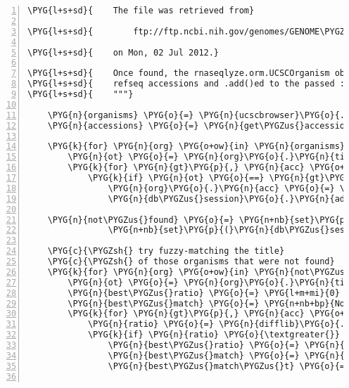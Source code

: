 \begin{Verbatim}[commandchars=\\\{\},numbers=left,firstnumber=1,stepnumber=5]
\PYG{l+s+sd}{    The file was retrieved from}

\PYG{l+s+sd}{        ftp://ftp.ncbi.nih.gov/genomes/GENOME\PYGZus{}REPORTS/prokaryotes.txt}

\PYG{l+s+sd}{    on Mon, 02 Jul 2012.}

\PYG{l+s+sd}{    Once found, the rnaseqlyze.orm.UCSCOrganism objects are updated with the}
\PYG{l+s+sd}{    refseq accessions and .add()ed to the passed :param:db\PYGZus{}session.}
\PYG{l+s+sd}{    """}

    \PYG{n}{organisms} \PYG{o}{=} \PYG{n}{ucscbrowser}\PYG{o}{.}\PYG{n}{get\PYGZus{}org\PYGZus{}list}\PYG{p}{(}\PYG{p}{)}
    \PYG{n}{accessions} \PYG{o}{=} \PYG{n}{get\PYGZus{}accessions}\PYG{p}{(}\PYG{p}{)}

    \PYG{k}{for} \PYG{n}{org} \PYG{o+ow}{in} \PYG{n}{organisms}\PYG{p}{:}
        \PYG{n}{ot} \PYG{o}{=} \PYG{n}{org}\PYG{o}{.}\PYG{n}{title}
        \PYG{k}{for} \PYG{n}{gt}\PYG{p}{,} \PYG{n}{acc} \PYG{o+ow}{in} \PYG{n}{accessions}\PYG{p}{:}
            \PYG{k}{if} \PYG{n}{ot} \PYG{o}{==} \PYG{n}{gt}\PYG{p}{:}
                \PYG{n}{org}\PYG{o}{.}\PYG{n}{acc} \PYG{o}{=} \PYG{n}{acc}
                \PYG{n}{db\PYGZus{}session}\PYG{o}{.}\PYG{n}{add}\PYG{p}{(}\PYG{n}{org}\PYG{p}{)}

    \PYG{n}{not\PYGZus{}found} \PYG{o}{=} \PYG{n+nb}{set}\PYG{p}{(}\PYG{n}{organisms}\PYG{p}{)} \PYG{o}{-} \PYGZbs{}
                \PYG{n+nb}{set}\PYG{p}{(}\PYG{n}{db\PYGZus{}session}\PYG{o}{.}\PYG{n}{query}\PYG{p}{(}\PYG{n}{UCSCOrganism}\PYG{p}{)}\PYG{o}{.}\PYG{n}{all}\PYG{p}{(}\PYG{p}{)}\PYG{p}{)}

    \PYG{c}{\PYGZsh{} try fuzzy-matching the title}
    \PYG{c}{\PYGZsh{} of those organisms that were not found}
    \PYG{k}{for} \PYG{n}{org} \PYG{o+ow}{in} \PYG{n}{not\PYGZus{}found}\PYG{p}{:}
        \PYG{n}{ot} \PYG{o}{=} \PYG{n}{org}\PYG{o}{.}\PYG{n}{title}
        \PYG{n}{best\PYGZus{}ratio} \PYG{o}{=} \PYG{l+m+mi}{0}
        \PYG{n}{best\PYGZus{}match} \PYG{o}{=} \PYG{n+nb+bp}{None}
        \PYG{k}{for} \PYG{n}{gt}\PYG{p}{,} \PYG{n}{acc} \PYG{o+ow}{in} \PYG{n}{accessions}\PYG{p}{:}
            \PYG{n}{ratio} \PYG{o}{=} \PYG{n}{difflib}\PYG{o}{.}\PYG{n}{SequenceMatcher}\PYG{p}{(}\PYG{n+nb+bp}{None}\PYG{p}{,} \PYG{n}{ot}\PYG{p}{,} \PYG{n}{gt}\PYG{p}{)}\PYG{o}{.}\PYG{n}{ratio}\PYG{p}{(}\PYG{p}{)}
            \PYG{k}{if} \PYG{n}{ratio} \PYG{o}{\textgreater{}} \PYG{n}{best\PYGZus{}ratio}\PYG{p}{:}
                \PYG{n}{best\PYGZus{}ratio} \PYG{o}{=} \PYG{n}{ratio}
                \PYG{n}{best\PYGZus{}match} \PYG{o}{=} \PYG{n}{acc}
                \PYG{n}{best\PYGZus{}match\PYGZus{}t} \PYG{o}{=} \PYG{n}{gt}


\end{Verbatim}
